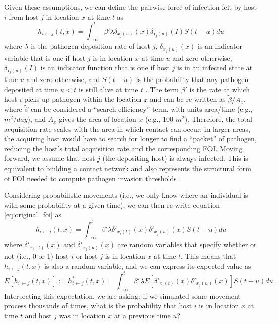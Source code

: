 \documentclass[letterpaper]{article}
\begin{document}
Given these assumptions, we can define the pairwise force of infection felt by host $i$ from host $j$ in location $x$ at time $t$ as \citep{Wilber2022}
\begin{equation}
    h_{i \leftarrow j}(t, x) = \int_{-\infty}^{t} \beta' \lambda \delta_{x_j(u)}(x) \delta_{I_j(u)}(I) S(t - u) du
    \label{eq:original_foi}
\end{equation}
where $\lambda$ is the pathogen deposition rate of host $j$, $\delta_{x_j(u)}(x)$ is an indicator variable that is one if host $j$ is in location $x$ at time $u$ and zero otherwise, $\delta_{I_j(u)}(I)$ is an indicator function that is one if host $j$ is in an infected state at time $u$ and zero otherwise, and $S(t-u)$ is the probability that any pathogen deposited at time $u < t$ is still alive at time $t$ \citep[see][for a full derivation]{Wilber2022}. 
The term $\beta'$ is the rate at which host $i$ picks up pathogen within the location $x$ and can be re-written as $\tilde{\beta} / A_x$, where $\tilde{\beta}$ can be considered a ``search efficiency'' term, with units area/time (e.g., $m^2 / day$), and $A_x$ gives the area of location $x$ (e.g., 100 $m^2$). 
Therefore, the total acquisition rate scales with the area in which contact can occur; in larger areas, the acquiring host would have to search for longer to find a ``packet'' of pathogen, reducing the host's total acquisition rate and the corresponding FOI. Moving forward, we assume that host $j$ (the depositing host) is always infected.  This is equivalent to building a contact network and also represents the structural form of FOI needed to compute pathogen invasion thresholds \citep{Wilber2022}.

Considering probabilistic movements (i.e., we only know where an individual is with some probability at a given time), we can then re-write equation \ref{eq:original_foi} as
\begin{equation}
    h_{i \leftarrow j}(t, x) = \int_{-\infty}^{t} \beta' \lambda \delta'_{x_i(t)}(x) \delta'_{x_j(u)}(x) S(t - u) du
    \label{eq:prob_foi}
\end{equation}
where $\delta'_{x_i(t)}(x)$ and $\delta'_{x_j(u)}(x)$ are random variables that specify whether or not (i.e., 0 or 1) host $i$ or host $j$ is in location $x$ at time $t$.  This means that $h_{i \leftarrow j}(t, x)$ is also a random variable, and we can express its expected value as 
\begin{equation}
    E[h_{i \leftarrow j}(t, x)] := h^*_{i \leftarrow j}(t, x) = \int_{-\infty}^{t} \beta' \lambda E[\delta'_{x_i(t)}(x) \delta'_{x_j(u)}(x)] S(t - u) du.
    \label{eq:expected_foi}
\end{equation}
Interpreting this expectation, we are asking: if we simulated some movement process thousands of times, what is the probability that host $i$ is in location $x$ at time $t$ and host $j$ was in location $x$ at a previous time $u$? 
\end{document}
